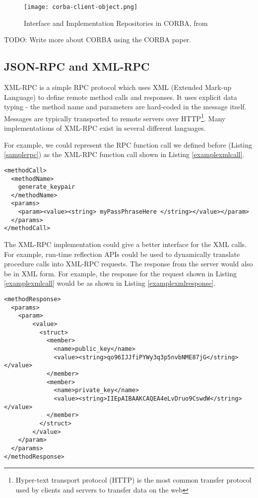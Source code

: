 \begin{figure}
    \centering
    \texttt{[image: corba-client-object.png]}
    \caption{Interface and Implementation Repositories in CORBA, from \cite{isocorba}}
    \label{fig:corba-interfaces}
\end{figure}

TODO: Write more about CORBA using the CORBA paper. \cite{vinoski1997corba}


\subsection{JSON-RPC and XML-RPC}
\label{sec:XMLJSOBRPC}
XML-RPC is a simple RPC protocol which uses XML (Extended Mark-up Language) to define remote method calls and responses. It uses explicit data typing - the method name and parameters are hard-coded in the message itself. Messages are typically transported to remote servers over HTTP\footnote{Hyper-text transport protocol (HTTP) is the most common transfer protocol used by clients and servers to transfer data on the web}. Many implementations of XML-RPC exist in several different languages. 

For example, we could represent the RPC function call we defined before (Listing \ref{samplerpc}) as the XML-RPC function call shown in Listing \ref{examplexmlcall}.

\begin{lstlisting}
<methodCall>
  <methodName>
    generate_keypair
  </methodName>
  <params>
    <param><value><string> myPassPhraseHere </string></value></param>
  </params>
</methodCall>
\end{lstlisting}

The XML-RPC implementation could give a better interface for the XML calls. For example, run-time reflection APIs could be used to dynamically translate procedure calls into XML-RPC requests. The response from the server would also be in XML form. For example, the response for the request shown in Listing \ref{examplexmlcall} would be as shown in Listing \ref{examplexmlresponse}.

\begin{lstlisting}
<methodResponse>
  <params>
    <param>
        <value>
          <struct>
            <member>
              <name>public_key</name>
              <value><string>qo96IJJfiPYWy3q3p5nvbNME87jG</string></value>
            </member>
            <member>
              <name>private_key</name>
              <value><string>IIEpAIBAAKCAQEA4eLvDruo9CswdW</string></value>
            </member>
          </struct>
        </value>
    </param>
  </params>
</methodResponse>
\end{lstlisting}

